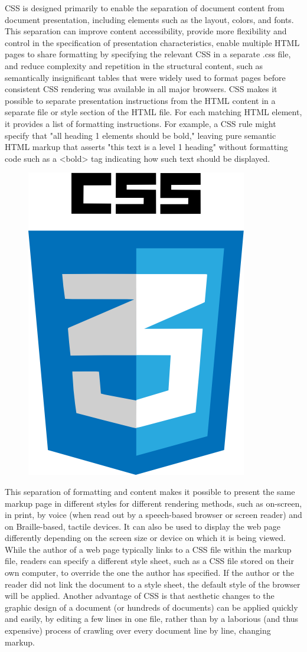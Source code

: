 CSS is designed primarily to enable the separation of document content from document presentation, including elements such as the layout, colors, and fonts. This separation can improve content accessibility, provide more flexibility and control in the specification of presentation characteristics, enable multiple HTML pages to share formatting by specifying the relevant CSS in a separate .css file, and reduce complexity and repetition in the structural content, such as semantically insignificant tables that were widely used to format pages before consistent CSS rendering was available in all major browsers. CSS makes it possible to separate presentation instructions from the HTML content in a separate file or style section of the HTML file. For each matching HTML element, it provides a list of formatting instructions. For example, a CSS rule might specify that "all heading 1 elements should be bold," leaving pure semantic HTML markup that asserts "this text is a level 1 heading" without formatting code such as a <bold> tag indicating how such text should be displayed.
\newline
\begin{figure}[h]
		\centering
		\includegraphics[width=0.4\linewidth]{images/css3_icon}
		\label{fig:css-logo}
\end{figure}
This separation of formatting and content makes it possible to present the same markup page in different styles for different rendering methods, such as on-screen, in print, by voice (when read out by a speech-based browser or screen reader) and on Braille-based, tactile devices. It can also be used to display the web page differently depending on the screen size or device on which it is being viewed. While the author of a web page typically links to a CSS file within the markup file, readers can specify a different style sheet, such as a CSS file stored on their own computer, to override the one the author has specified. If the author or the reader did not link the document to a style sheet, the default style of the browser will be applied. Another advantage of CSS is that aesthetic changes to the graphic design of a document (or hundreds of documents) can be applied quickly and easily, by editing a few lines in one file, rather than by a laborious (and thus expensive) process of crawling over every document line by line, changing markup.
\newline

